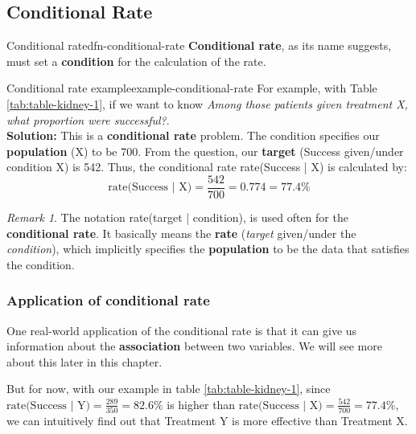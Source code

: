 \documentclass[math,code]{amznotes}
\theoremstyle{remark}
\newtheorem*{remark}{Remark}
\begin{document}
\subsection{Conditional Rate}
\begin{dfnbox}{Conditional rate}{dfn-conditional-rate}
    {\color{red} \textbf{Conditional rate}}, as its name suggests, must set a \textbf{condition} for the calculation of the rate.
\end{dfnbox}
\begin{exbox}{Conditional rate example}{example-conditional-rate}
    For example, with Table \ref{tab:table-kidney-1}, if we want to know \textit{Among those patients given treatment X, what proportion were successful?}. \\ 
    \textbf{Solution:} This is a \textbf{conditional rate} problem. The condition specifies our \textbf{population} (X) to be 700. From the question, our \textbf{target} (Success given/under condition X) is 542. Thus, the conditional rate rate(Success | X) is calculated by:
    \begin{displaymath}
        \text{rate(Success | X)}=\frac{542}{700}=0.774=77.4\%
    \end{displaymath}
\end{exbox}
\begin{notebox}
    \begin{remark}
        The notation rate(target | condition), is used often for the \textbf{conditional rate}. It basically means the \textbf{rate} (\textit{target} given/under the \textit{condition}), which implicitly specifies the \textbf{population} to be the data that satisfies the condition.
    \end{remark}
\end{notebox}
\subsubsection{Application of conditional rate}
One real-world application of the conditional rate is that it can give us information about the \textbf{association} between two variables. We will see more about this later in this chapter.

But for now, with our example in table \ref{tab:table-kidney-1}, since $\text{rate(Success | Y)}=\frac{289}{350}=82.6\%$ is higher than $\text{rate(Success | X)}=\frac{542}{700}=77.4\%$, we can intuitively find out that Treatment Y is more effective than Treatment X.
\end{document}
